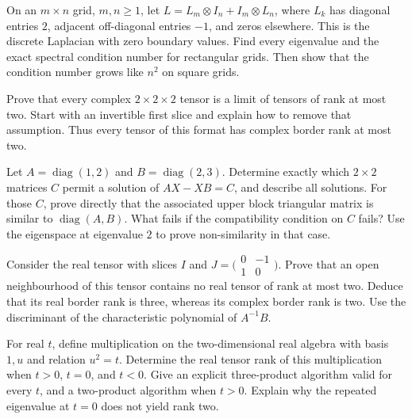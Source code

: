\begin{exercise}[$\star\star$]\label{linear:ex:gridlap}
On an $m\times n$ grid, $m,n\ge1$, let $L=L_m\otimes I_n+I_m\otimes L_n$, where $L_k$ has diagonal entries $2$, adjacent off-diagonal entries $-1$, and zeros elsewhere. This is the discrete Laplacian with zero boundary values. Find every eigenvalue and the exact spectral condition number for rectangular grids. Then show that the condition number grows like $n^2$ on square grids.
\end{exercise}

\begin{exercise}[$\star\star\star$]\label{linear:ex:border}
Prove that every complex $2\times2\times2$ tensor is a limit of tensors of rank at most two. Start with an invertible first slice and explain how to remove that assumption. Thus every tensor of this format has complex border rank at most two.
\end{exercise}

\begin{exercise}[$\star\star$]\label{ex:v10new-ch02-sylvester-obstruction}
Let $A=\operatorname{diag}(1,2)$ and $B=\operatorname{diag}(2,3)$. Determine exactly which $2\times2$ matrices $C$ permit a solution of $AX-XB=C$, and describe all solutions. For those $C$, prove directly that the associated upper block triangular matrix is similar to $\operatorname{diag}(A,B)$. What fails if the compatibility condition on $C$ fails? Use the eigenspace at eigenvalue $2$ to prove non-similarity in that case.
\end{exercise}

\begin{exercise}[$\star\star$]\label{ex:v10new-ch02-real-border}
Consider the real tensor with slices $I$ and $J=\bigl(\begin{smallmatrix}0&-1\\1&0\end{smallmatrix}\bigr)$. Prove that an open neighbourhood of this tensor contains no real tensor of rank at most two. Deduce that its real border rank is three, whereas its complex border rank is two. Use the discriminant of the characteristic polynomial of $A^{-1}B$.
\end{exercise}

\begin{exercise}[$\star\star$]\label{ex:v10new-ch02-quadratic-algebra}
For real $t$, define multiplication on the two-dimensional real algebra with basis $1,u$ and relation $u^2=t$. Determine the real tensor rank of this multiplication when $t>0$, $t=0$, and $t<0$. Give an explicit three-product algorithm valid for every $t$, and a two-product algorithm when $t>0$. Explain why the repeated eigenvalue at $t=0$ does not yield rank two.
\end{exercise}

